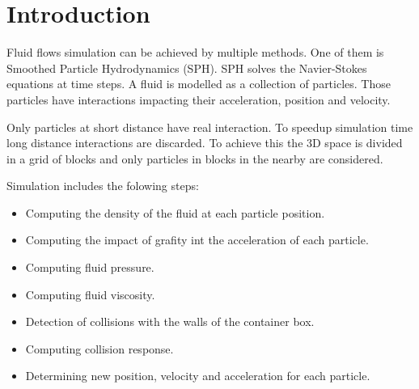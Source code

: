\section{Introduction}

Fluid flows simulation can be achieved by multiple methods. One of them is
Smoothed Particle Hydrodynamics (SPH). SPH solves the Navier-Stokes equations
at time steps. A fluid is modelled as a collection of particles. Those
particles have interactions impacting their acceleration, position and velocity.

Only particles at short distance have real interaction. To speedup simulation
time long distance interactions are discarded. To achieve this the 3D space
is divided in a grid of blocks and only particles in blocks in the nearby are
considered.

Simulation includes the folowing steps:
\begin{itemize}
\item Computing the density of the fluid at each particle position.
\item Computing the impact of grafity int the acceleration of each particle.
\item Computing fluid pressure.
\item Computing fluid viscosity.
\item Detection of collisions with the walls of the container box.
\item Computing collision response.
\item Determining new position, velocity and acceleration for each particle.
\end{itemize}
